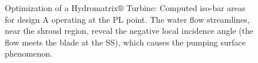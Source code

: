 \begin{figure}[h!]
\begin{minipage}[b]{1\linewidth}
 \centering
\end{minipage}
\caption{Optimization of a Hydromatrix$\circledR$ Turbine: Computed iso-bar areas for design A operating at the PL point. The water flow streamlines, near the shroud region, reveal the negative local incidence angle (the flow meets the blade at the SS), which causes the pumping surface phenomenon. }
\label{design-PL-M}
\end{figure}


